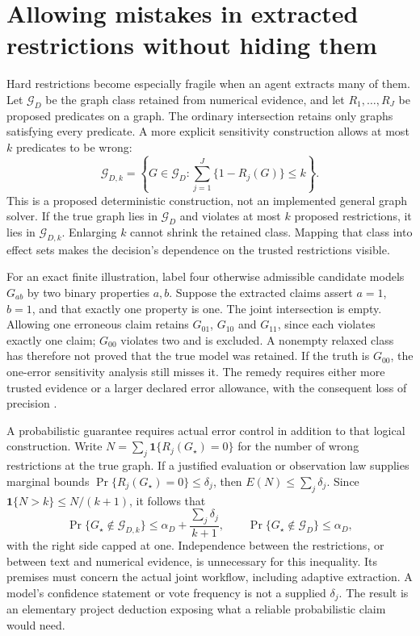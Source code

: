 \section{Allowing mistakes in extracted restrictions without hiding them}
\label{exec14:l4-restriction-errors}

Hard restrictions become especially fragile when an agent extracts many of
them. Let $\mathcal G_D$ be the graph class retained from numerical evidence,
and let $R_1,\ldots,R_J$ be proposed predicates on a graph. The ordinary
intersection retains only graphs satisfying every predicate. A more explicit
sensitivity construction allows at most $k$ predicates to be wrong:
\[
 \mathcal G_{D,k}=\left\{G\in\mathcal G_D:
       \sum_{j=1}^J\{1-R_j(G)\}\leq k\right\}.
\]
This is a proposed deterministic construction, not an implemented general
graph solver. If the true graph lies in $\mathcal G_D$ and violates at most
$k$ proposed restrictions, it lies in $\mathcal G_{D,k}$. Enlarging $k$ cannot
shrink the retained class. Mapping that class into effect sets makes the
decision's dependence on the trusted restrictions visible.

For an exact finite illustration, label four otherwise admissible candidate
models $G_{ab}$ by two binary properties $a,b$. Suppose the extracted claims
assert $a=1$, $b=1$, and that exactly one property is one. The joint
intersection is empty. Allowing one erroneous claim retains $G_{01}$,
$G_{10}$ and $G_{11}$, since each violates exactly one claim; $G_{00}$
violates two and is excluded. A nonempty relaxed class has therefore not
proved that the true model was retained. If the truth is $G_{00}$, the
one-error sensitivity analysis still misses it. The remedy requires either
more trusted evidence or a larger declared error allowance, with the
consequent loss of precision \citep{exec14_discovery_design_oracles}.

A probabilistic guarantee requires actual error control in addition to that
logical construction. Write $N=\sum_j\mathbf1\{R_j(G_\star)=0\}$ for
the number of wrong restrictions at the true graph. If a justified evaluation
or observation law supplies marginal bounds
$\Pr\{R_j(G_\star)=0\}\leq\delta_j$, then
$E(N)\leq\sum_j\delta_j$. Since
$\mathbf1\{N>k\}\leq N/(k+1)$, it follows that
\[
 \Pr\{G_\star\notin\mathcal G_{D,k}\}
 \leq \alpha_D+\frac{\sum_j\delta_j}{k+1},
 \qquad
 \Pr\{G_\star\notin\mathcal G_D\}\leq\alpha_D,
\]
with the right side capped at one. Independence between the restrictions,
or between text and numerical evidence, is unnecessary for this inequality.
Its premises must concern the actual joint workflow, including adaptive
extraction. A model's confidence statement or vote frequency is not a
supplied $\delta_j$. The result is an elementary project deduction exposing
what a reliable probabilistic claim would need.

